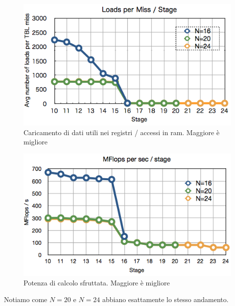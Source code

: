 \documentclass[12pt,a4paper,oneside,openright]{report}
\begin{document}
\begin{figure}[h!]
  \centering
      \includegraphics[width=\textwidth]{immagini/Miss}
  \caption{Caricamento di dati utili nei registri / accessi in ram. Maggiore è migliore}
\label{Miss}
\end{figure}

\begin{figure}[h!]
  
  \centering
      \includegraphics[width=\textwidth]{immagini/Mflops}
  \caption{Potenza di calcolo sfruttata. Maggiore è migliore}
\label{MFlops}
\end{figure}
Notiamo come $N=20$ e $N=24$ abbiano esattamente lo stesso andamento.
\end{document}
